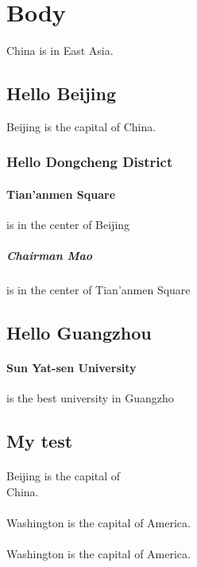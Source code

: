 
\clearpage

\section{Body} China is in East Asia. 

\subsection{Hello Beijing} Beijing is the capital of China. 

\subsubsection{Hello Dongcheng District} 
\paragraph{Tian'anmen Square}is in the center of Beijing 
\subparagraph{Chairman Mao} is in the center of Tian'anmen Square 
\subsection{Hello Guangzhou} 
\paragraph{Sun Yat-sen University} is the best university in Guangzho
\subsection{My test}
\paragraph{}Beijing is the capital of \\ China.  %
\paragraph{}Washington is the capital of America. 
\paragraph{}Washington is the capital of America.